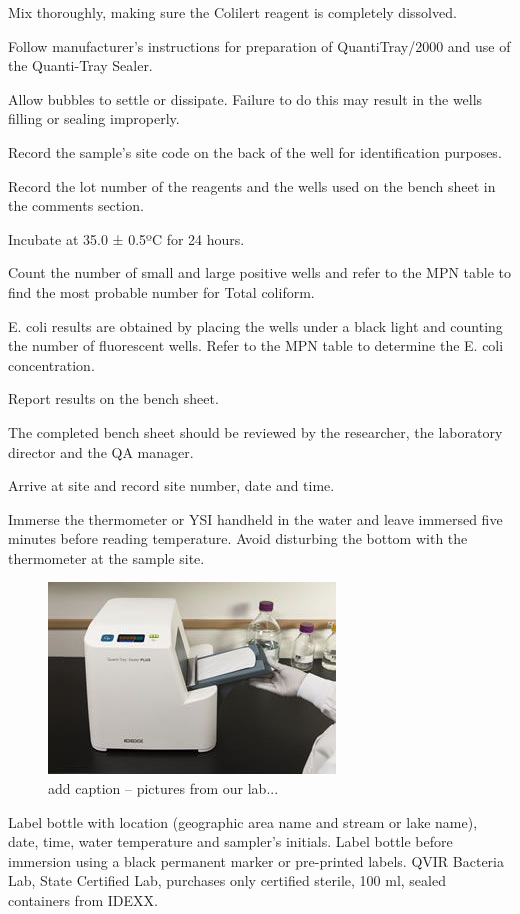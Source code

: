 \documentclass[12pt]{../SOP4_alpha}\usepackage[]{graphicx}\usepackage[]{color}
\begin{document}
Mix thoroughly, making sure the Colilert reagent is completely
dissolved.

Follow manufacturer’s instructions for preparation of QuantiTray/2000 and use of the Quanti-Tray Sealer.

Allow bubbles to settle or dissipate. Failure to do this may result in
the wells filling or sealing improperly.

Record the sample’s site code on the back of the well for
identification purposes.

Record the lot number of the reagents and the wells used on the
bench sheet in the comments section.

Incubate at 35.0 ± 0.5ºC for 24 hours.

Count the number of small and large positive wells and refer to the
MPN table to find the most probable number for Total coliform.


E. coli results are obtained by placing the wells under a black light
and counting the number of fluorescent wells. Refer to the MPN
table to determine the E. coli concentration.

Report results on the bench sheet.

The completed bench sheet should be reviewed by the researcher, the
laboratory director and the QA manager. 

\NP Arrive at site and record site number, date and time.

\NP Immerse the thermometer or YSI handheld in the water and leave immersed
five minutes before reading temperature. Avoid disturbing the bottom with
the thermometer at the sample site.

\begin{figure}
\includegraphics{Step1.jpg}
\caption{add caption -- pictures from our lab...}
\end{figure}

\NP Label bottle with location (geographic area name and stream or lake name),
date, time, water temperature and sampler's initials. Label bottle before
immersion using a black permanent marker or pre-printed labels. QVIR
Bacteria Lab, State Certified Lab, purchases only certified sterile, 100 ml,
sealed containers from IDEXX.
\end{document}
